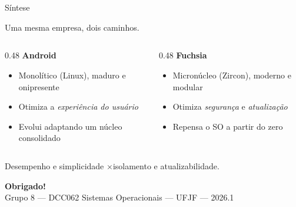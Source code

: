 \documentclass[aspectratio=169,11pt]{beamer}
\newcommand{\ANDROID}{\textbf{\color{androidVerde}Android}}
\newcommand{\FUCHSIA}{\textbf{\color{fuchsiaCor}Fuchsia}}
\newcommand{\comparar}[2]{%
  \begin{columns}[T,onlytextwidth]
    \begin{column}{0.48\textwidth}
      \ANDROID\par\smallskip
      \begin{itemize}\footnotesize #1 \end{itemize}
    \end{column}
    \begin{column}{0.48\textwidth}
      \FUCHSIA\par\smallskip
      \begin{itemize}\footnotesize #2 \end{itemize}
    \end{column}
  \end{columns}%
}
\begin{document}
\section{}

\begin{frame}{Síntese}
  \begin{center}
    \large Uma mesma empresa, dois caminhos.
  \end{center}
  \vfill
  \comparar{
    \item Monolítico (Linux), maduro e onipresente
    \item Otimiza a \emph{experiência do usuário}
    \item Evolui adaptando um núcleo consolidado
  }{
    \item Micronúcleo (Zircon), moderno e modular
    \item Otimiza \emph{segurança} e \emph{atualização}
    \item Repensa o SO a partir do zero
  }
  \vfill
  \begin{center}\small\color{azulUFJF}
    Desempenho e simplicidade \quad$\times$\quad isolamento e atualizabilidade.
  \end{center}
\end{frame}

{
\begin{frame}[plain]
  \centering
  \vfill
  {\Huge\color{azulUFJF}\bfseries Obrigado!}\\[2em]
  \footnotesize Grupo 8 --- DCC062 Sistemas Operacionais --- UFJF --- 2026.1
  \vfill
\end{frame}}
\end{document}
